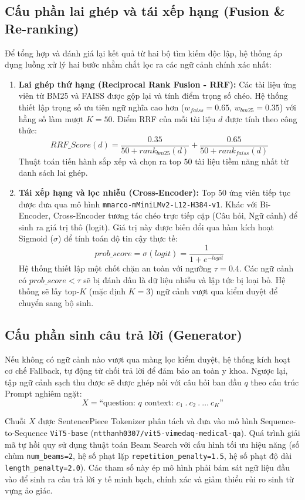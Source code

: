 \subsection{Cấu phần lai ghép và tái xếp hạng (Fusion \& Re-ranking)}
Để tổng hợp và đánh giá lại kết quả từ hai bộ tìm kiếm độc lập, hệ thống áp dụng luồng xử lý hai bước nhằm chắt lọc ra các ngữ cảnh chính xác nhất:
\begin{enumerate}
    \item \textbf{Lai ghép thứ hạng (Reciprocal Rank Fusion - RRF):} Các tài liệu ứng viên từ BM25 và FAISS được gộp lại và tính điểm trọng số chéo. Hệ thống thiết lập trọng số ưu tiên ngữ nghĩa cao hơn ($w_{faiss} = 0.65$, $w_{bm25} = 0.35$) với hằng số làm mượt $K = 50$. Điểm RRF của mỗi tài liệu $d$ được tính theo công thức:
    $$RRF\_Score(d) = \frac{0.35}{50 + rank_{bm25}(d)} + \frac{0.65}{50 + rank_{faiss}(d)}$$
    Thuật toán tiến hành sắp xếp và chọn ra top $50$ tài liệu tiềm năng nhất từ danh sách lai ghép.
    
    \item \textbf{Tái xếp hạng và lọc nhiễu (Cross-Encoder):} Top $50$ ứng viên tiếp tục được đưa qua mô hình \texttt{mmarco-mMiniLMv2-L12-H384-v1}. Khác với Bi-Encoder, Cross-Encoder tương tác chéo trực tiếp cặp (Câu hỏi, Ngữ cảnh) để sinh ra giá trị thô (logit). Giá trị này được biến đổi qua hàm kích hoạt Sigmoid ($\sigma$) để tính toán độ tin cậy thực tế:
    $$prob\_score = \sigma(logit) = \frac{1}{1 + e^{-logit}}$$
    Hệ thống thiết lập một chốt chặn an toàn với ngưỡng $\tau = 0.4$. Các ngữ cảnh có $prob\_score < \tau$ sẽ bị đánh dấu là dữ liệu nhiễu và lập tức bị loại bỏ. Hệ thống sẽ lấy top-$K$ (mặc định $K=3$) ngữ cảnh vượt qua kiểm duyệt để chuyển sang bộ sinh.
\end{enumerate}

\subsection{Cấu phần sinh câu trả lời (Generator)}
Nếu không có ngữ cảnh nào vượt qua màng lọc kiểm duyệt, hệ thống kích hoạt cơ chế Fallback, tự động từ chối trả lời để đảm bảo an toàn y khoa. Ngược lại, tập ngữ cảnh sạch thu được sẽ được ghép nối với câu hỏi ban đầu $q$ theo cấu trúc Prompt nghiêm ngặt:
$$X = \text{``question: } q \text{ context: } c_1 \ . \ c_2 \ . \ \dots \ c_K\text{''}$$

\noindent Chuỗi $X$ được SentencePiece Tokenizer phân tách và đưa vào mô hình Sequence-to-Sequence \texttt{ViT5-base} (\texttt{ntthanh0307/vit5-vimedaq-medical-qa}). Quá trình giải mã tự hồi quy sử dụng thuật toán Beam Search với cấu hình tối ưu hiệu năng (số chùm \texttt{num\_beams=2}, hệ số phạt lặp \texttt{repetition\_penalty=1.5}, hệ số phạt độ dài \texttt{length\_penalty=2.0}). Các tham số này ép mô hình phải bám sát ngữ liệu đầu vào để sinh ra câu trả lời y tế minh bạch, chính xác và giảm thiểu rủi ro sinh từ vựng ảo giác.

